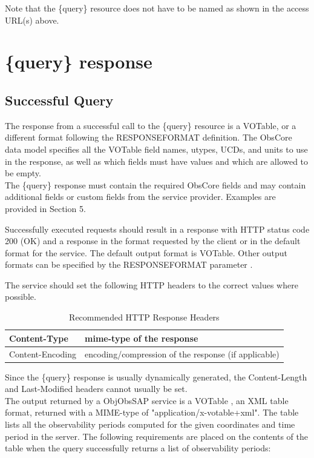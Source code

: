 \documentclass[11pt,a4paper]{ivoatex/ivoa}
\begin{document}
Note that the \{query\} resource does not have to be named as shown in
the access URL(s) above.

\section{\{query\} response}

\subsection{Successful Query}
The response from a successful call to the \{query\} resource is a
VOTable, or a different format following the RESPONSEFORMAT definition.
The ObsCore data model specifies all the VOTable \citep{2019ivoa.spec.1021O}
field names, utypes, UCDs, and units to use in the response, as well
as which fields must have values and which are allowed to be empty.\\
The \{query\} response must contain the required ObsCore \citep{2017ivoa.spec.0509L}
fields and may contain additional fields or custom fields from the service
provider. Examples are provided in Section 5.\par

Successfully executed requests should result in a response with HTTP
status code 200 (OK) and a response in the format requested by the
client or in the default format for the service. The default output
format is VOTable. Other output formats can be specified by the
RESPONSEFORMAT parameter \citep{2017ivoa.spec.0517D}.\par

The service should set the following HTTP headers to the correct values
where possible.

\begin{table}[h]
\centering
\begin{tabular}{|l|l|}
\hline
Content-Type & mime-type of the response \\
\hline
Content-Encoding & encoding/compression of the response (if applicable)
\\
\hline
\end{tabular}
\caption{Recommended HTTP Response Headers}
\end{table}
\par
Since the \{query\} response is usually dynamically generated, the
Content-Length and Last-Modified headers cannot usually be set.\\

The output returned by a ObjObsSAP service is a VOTable , an XML table
format, returned with a MIME-type of "application/x-votable+xml". The
table lists all the observability periods computed for the given
coordinates and time period in the server. The following requirements
are placed on the contents of the table when the query successfully
returns a list of observability periods:
\end{document}
